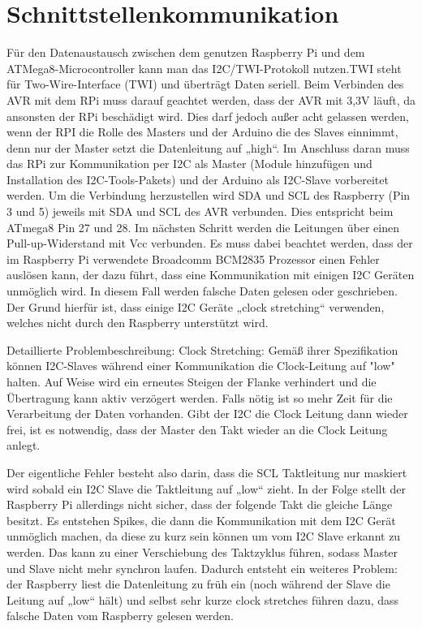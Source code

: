 
\chapter{Schnittstellenkommunikation}
Für den Datenaustausch zwischen dem genutzen Raspberry Pi und dem ATMega8-Microcontroller kann man das I2C/TWI-Protokoll nutzen.TWI steht für Two-Wire-Interface (TWI) und überträgt Daten seriell. 
Beim Verbinden des AVR mit dem RPi muss darauf geachtet werden, dass der AVR mit 3,3V läuft, da ansonsten der RPi beschädigt wird. Dies darf jedoch außer acht gelassen werden, wenn der RPI die Rolle des Masters und der Arduino die des Slaves einnimmt, denn nur der Master setzt die Datenleitung auf „high“.
Im Anschluss daran muss das RPi zur Kommunikation per I2C als Master (Module hinzufügen und Installation des I2C-Tools-Pakets) und der Arduino als I2C-Slave vorbereitet werden. 
Um die Verbindung herzustellen wird SDA und SCL des Raspberry (Pin 3 und 5) jeweils mit SDA und SCL des AVR verbunden. Dies entspricht beim ATmega8 Pin 27 und 28. Im nächsten Schritt werden die Leitungen über einen Pull-up-Widerstand mit Vcc verbunden.
Es muss dabei beachtet werden, dass der im Raspberry Pi verwendete Broadcomm BCM2835 Prozessor einen Fehler auslösen kann, der dazu führt, dass eine Kommunikation mit einigen I2C Geräten unmöglich wird. In diesem Fall werden falsche Daten gelesen oder geschrieben. Der Grund hierfür ist, dass einige I2C Geräte „clock stretching“ verwenden, welches nicht durch den Raspberry unterstützt wird. 

Detaillierte Problembeschreibung:
Clock Stretching: Gemäß ihrer Spezifikation können I2C-Slaves während einer Kommunikation die Clock-Leitung auf "low" halten. Auf Weise wird ein erneutes Steigen der Flanke verhindert und die Übertragung kann aktiv verzögert werden. Falls nötig ist so mehr Zeit für die Verarbeitung der Daten vorhanden. Gibt der I2C die Clock Leitung dann wieder frei, ist es notwendig, dass der Master den Takt wieder an die Clock Leitung anlegt.

Der eigentliche Fehler besteht also darin, dass die SCL Taktleitung nur maskiert wird sobald ein I2C Slave die Taktleitung auf „low“ zieht. In der Folge stellt der Raspberry Pi allerdings nicht sicher, dass der folgende Takt die gleiche Länge besitzt. Es entstehen Spikes, die dann die Kommunikation mit dem I2C Gerät unmöglich machen, da diese zu kurz sein können um vom I2C Slave erkannt zu werden. Das kann zu einer Verschiebung des Taktzyklus führen, sodass Master und Slave nicht mehr synchron laufen. 
Dadurch entsteht ein weiteres Problem: der Raspberry liest die Datenleitung zu früh ein (noch während der Slave die Leitung auf „low“ hält) und selbst sehr kurze clock stretches führen dazu, dass falsche Daten vom Raspberry gelesen werden.

